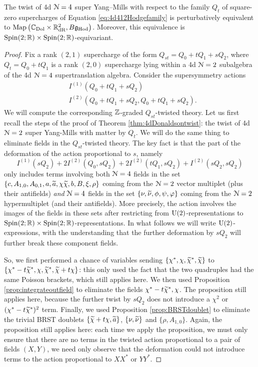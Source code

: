 \documentclass[10pt, oneside]{article}
\newcommand{\Hod}{\mathrm{Hod}}
\begin{document}
\begin{theorem}
The twist of 4d $\mathcal N=4$ super Yang--Mills with respect to the family $Q_t$ of square-zero supercharges of Equation \ref{eq:4d412Hodgefamily} is perturbatively equivalent to $\map\left(\CC_{\rm Dol} \times \RR^2_{\mr{dR}}, B\fg_{\Hod}\right)$. Moreover, this equivalence is $\mathrm{Spin}(2;\mathbb R) \times \mathrm{Spin}(2;\mathbb R)$-equivariant.
\end{theorem}

\begin{proof}
Fix a rank $(2,1)$ supercharge of the form $Q_{st} = Q_0 + tQ_1 + sQ_2$, where $Q_t = Q_0 + tQ_1$ is a rank $(2,0)$ supercharge lying within a 4d $\mathcal{N}=2$ subalgebra of the 4d $\mathcal{N}=4$ supertranslation algebra.  Consider the supersymmetry actions 
\begin{align*}
&I^{(1)}(Q_0 + tQ_1 + sQ_2) \\
&I^{(2)}(Q_0 + tQ_1 + sQ_2, Q_0 + tQ_1 + sQ_2).
\end{align*}
We will compute the corresponding $\mathbb Z$-graded $Q_{st}$-twisted theory.  Let us first recall the steps of the proof of Theorem \ref{thm:4dDonaldsontwist}: the twist of 4d $\mathcal{N}=2$ super Yang-Mills with matter by $Q_t$.  We will do the same thing to eliminate fields in the $Q_{st}$-twisted theory.  The key fact is that the part of the deformation of the action proportional to $s$, namely
\[I^{(1)}(sQ_2) + 2 I^{(2)}(Q_0, sQ_2) + 2 I^{(2)}(tQ_1, sQ_2) + I^{(2)}(sQ_2, sQ_2)\]
only includes terms involving both $\mathcal{N}=4$ fields in the set $\{c, A_{1,0}, A_{0,1}, a, \widetilde{a}, \chi \widetilde{\chi}, b, B, \xi, \rho\}$ coming from the $\mathcal{N}=2$ vector multiplet (plus their antifields) \emph{and} $\mathcal{N}=4$ fields in the set $\{\nu, \widetilde{\nu}, \phi, \psi, \varphi\}$ coming from the $\mathcal{N}=2$ hypermultiplet (and their antifields).  More precisely, the action involves the images of the fields in these sets after restricting from $\mathrm{U}(2)$-representations to $\mathrm{Spin}(2;\mathbb R) \times \mathrm{Spin}(2;\mathbb R)$-representations.  In what follows we will write $\mathrm{U}(2)$-expressions, with the understanding that the further deformation by $sQ_2$ will further break these component fields.

So, we first performed a chance of variables sending $\{\chi^*, \chi, \widetilde{\chi}^*, \widetilde{\chi}\}$ to $\{\chi^*-t\widetilde{\chi}^*, \chi, \widetilde{\chi}^*, \widetilde{\chi} + t\chi\}$: this only used the fact that the two quadruples had the same Poisson brackets, which still applies here.  We then used Proposition \ref{prop:integrateoutfield} to eliminate the fields $\chi^*-t\widetilde{\chi}^*, \chi$.  The proposition still applies here, because the further twist by $sQ_2$ does not introduce a $\chi^2$ or $(\chi^*-t\widetilde{\chi}^*)^2$ term.  Finally, we used Proposition \ref{prop:BRSTdoublet} to eliminate the trivial BRST doublets $\{\widetilde{\chi} + t\chi, \widetilde{a}\}$, $\{\nu, \widetilde{\nu}\}$ and $\{\rho, A_{1, 0}\}$.  Again, the proposition still applies here: each time we apply the proposition, we must only ensure that there are no terms in the twisted action proportional to a pair of fields $(X, Y)$, we need only observe that the deformation could not introduce terms to the action proportional to $XX^*$ or $YY^*$.


\end{proof}
\end{document}
